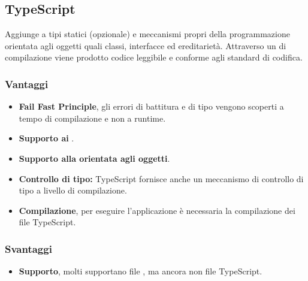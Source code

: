 \subsection{TypeScript}
Aggiunge a  tipi statici (opzionale) e meccanismi propri della programmazione orientata agli oggetti quali classi, interfacce ed ereditariet\`a. Attraverso un  di compilazione viene prodotto codice  leggibile e conforme agli standard di codifica. 
\subsubsection{Vantaggi}
\begin{itemize}
\item \textbf{Fail Fast Principle}, gli errori di battitura e di tipo vengono scoperti a tempo di compilazione e non a runtime.
\item \textbf{Supporto ai }.
\item \textbf{Supporto alla  orientata agli oggetti}.
\item \textbf{Controllo di tipo:} TypeScript fornisce anche un meccanismo di controllo di tipo a livello di compilazione.
\item \textbf{Compilazione}, per eseguire l'applicazione \`e necessaria la compilazione dei file TypeScript.
\end{itemize}
\subsubsection{Svantaggi}
\begin{itemize}
\item \textbf{Supporto}, molti  supportano file , ma ancora non file TypeScript.
\end{itemize}
